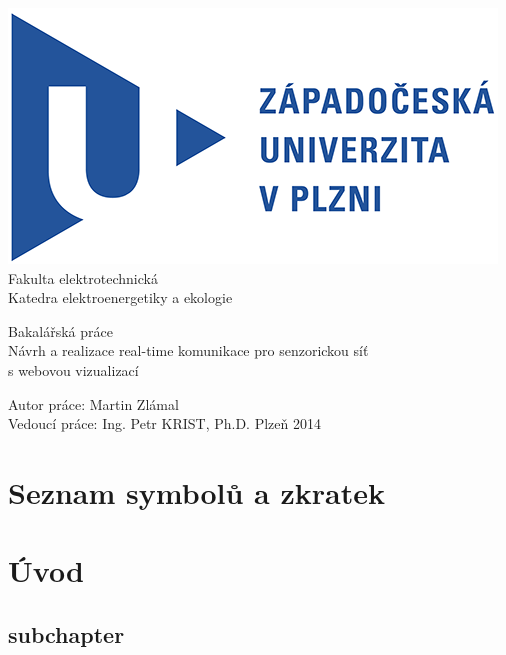 \documentclass[oneside,12pt,a4paper]{book} %
\begin{document}
\pagestyle{empty}
\begin{titlepage}
\noindent
\includegraphics[scale=1]{zcu.png} \\[0.3cm]
Fakulta elektrotechnická \\
Katedra elektroenergetiky a ekologie
\vspace{5cm}
\begin{center}
	{\Huge\sc Bakalářská práce} \\
	\vspace{1cm}
	{\large Návrh a realizace real-time komunikace pro senzorickou síť\\s webovou vizualizací}
\end{center}
\vfill
Autor práce: Martin Zlámal\\
Vedoucí práce: Ing. Petr KRIST, Ph.D. \hfill Plzeň 2014
\end{titlepage}






\tableofcontents
\cleardoublepage
{}
\listoffigures
\cleardoublepage
{}
\listoftables
\chapter*{Seznam symbolů a zkratek}

\chapter{Úvod}
\section{subchapter}
\end{document}
